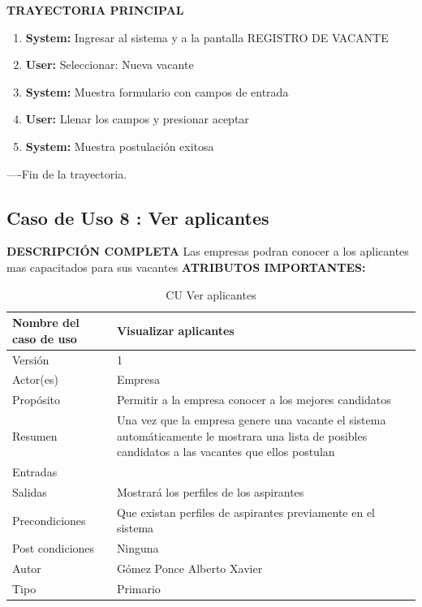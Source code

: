 \textbf{TRAYECTORIA PRINCIPAL}			
\begin{enumerate}			
\item \textbf{	System: 	}	Ingresar al sistema y a la pantalla REGISTRO DE VACANTE
\item \textbf{	User: 	}	Seleccionar: Nueva vacante
\item \textbf{	System: 	}	Muestra formulario con campos de entrada
\item \textbf{	User: 	}	Llenar los campos y presionar aceptar
\item \textbf{	System: 	}	Muestra postulación exitosa
			
			
			
			
\end{enumerate}			
----Fin de la trayectoria.			





\newpage			
\subsection{Caso de Uso 	8	: Ver aplicantes	}
		\textbf{DESCRIPCIÓN COMPLETA}	
		\newline 	
		Las empresas podran conocer a los aplicantes mas capacitados para sus vacantes	
\newline	\newline	\textbf{ATRIBUTOS IMPORTANTES:}	

\begin{table}[h]			
        \begin{center}			
\begin{tabular}{|l|p{11cm}|} \hline			
Nombre del caso de uso	&	Visualizar aplicantes	\\ \hline
Versión	&	1	\\ \hline
Actor(es)	&	Empresa	\\ \hline
Propósito	&	Permitir a la empresa conocer a los mejores candidatos	\\ \hline
Resumen	&	Una vez que la empresa genere una vacante el sistema automáticamente le mostrara una lista de posibles candidatos a las vacantes que ellos postulan	\\ \hline
Entradas	&		
			
			
			
			\\ \hline
Salidas	&	Mostrará los perfiles de los aspirantes 	\\ \hline
Precondiciones	&	Que existan perfiles de aspirantes previamente en el sistema 	\\ \hline
Post condiciones	&	Ninguna 	\\ \hline
Autor	&	Gómez Ponce Alberto Xavier	\\ \hline
Tipo	&	Primario	\\ \hline
\end{tabular}			
        \caption	{	CU Ver aplicantes	}
        \label	{tabla	8	}
        \end{center}			
\end{table}			

